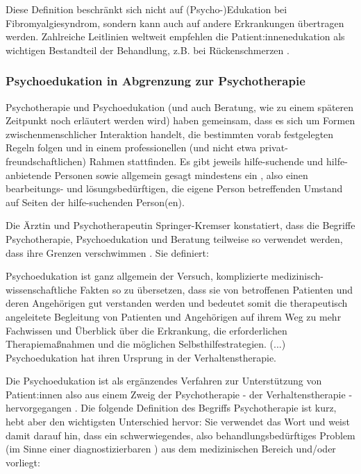 \documentclass[
  twoside,
  parskip=half-,
]{scrreprt}
\begin{document}
Diese Definition beschränkt sich nicht auf (Psycho-)Edukation bei Fibromyalgiesyndrom, sondern 
kann auch auf andere Erkrankungen übertragen werden. Zahlreiche Leitlinien weltweit empfehlen die Patient:innenedukation als wichtigen Bestandteil der Behandlung, z.B. bei Rückenschmerzen \autocite[7]{HeftSchmerz1}.

\subsubsection{Psychoedukation in Abgrenzung zur Psychotherapie}

Psychotherapie und Psychoedukation (und auch Beratung, wie zu einem späteren Zeitpunkt noch erläutert werden wird) haben gemeinsam, dass es sich um Formen zwischenmenschlicher Interaktion handelt, die bestimmten vorab festgelegten Regeln folgen und in einem professionellen (und nicht etwa privat-freundschaftlichen) Rahmen stattfinden. Es gibt jeweils hilfe-suchende und hilfe-anbietende Personen sowie allgemein gesagt mindestens ein , also einen bearbeitungs- und lösungsbedürftigen, die eigene Person betreffenden Umstand auf Seiten der hilfe-suchenden Person(en). 

Die Ärztin und Psychotherapeutin Springer-Kremser konstatiert, dass die Begriffe Psychotherapie, Psychoedukation und Beratung teilweise so verwendet werden, dass ihre Grenzen verschwimmen \autocite[vgl.][897]{integrativePsycho}. Sie definiert:
  
  \begin{displayquote}
    Psychoedukation ist ganz allgemein der Versuch, komplizierte medizinisch-wissenschaftliche Fakten so zu übersetzen, dass sie von betroffenen Patienten und deren Angehörigen gut verstanden werden und bedeutet somit die therapeutisch angeleitete Begleitung von Patienten und Angehörigen auf ihrem Weg zu mehr Fachwissen und Überblick über die Erkrankung, die erforderlichen Therapiemaßnahmen und die möglichen Selbsthilfestrategien. (...) Psychoedukation hat ihren Ursprung in der Verhaltenstherapie.
  \end{displayquote}
  
Die Psychoedukation ist als ergänzendes Verfahren zur Unterstützung von Patient:innen also aus einem Zweig der Psychotherapie - der Verhaltenstherapie - hervorgegangen \autocite[vgl. auch][6]{wachter}. Die folgende Definition des Begriffs Psychotherapie ist kurz, hebt aber den wichtigsten Unterschied hervor: Sie verwendet das Wort  und weist damit darauf hin, dass ein schwerwiegendes, also behandlungsbedürftiges Problem (im Sinne einer diagnostizierbaren ) aus dem medizinischen Bereich und/oder  vorliegt:
\end{document}
